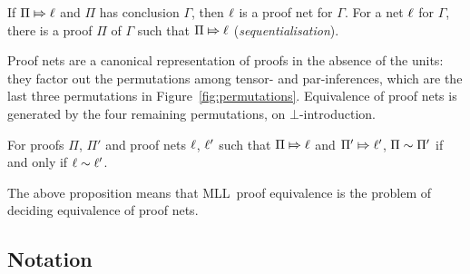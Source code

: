 \documentclass{sigplanconf}
\let\capsabbrev=\uppercase
\begin{document}
\begin{proposition}
\label{prop:correctness and sequentialisation}
%
%
If $\Pi\Mapsto\ell$ and $\Pi$ has conclusion $\Gamma$, then $\ell$ is a proof net for $\Gamma$.
%
For a net $\ell$ for $\Gamma$, there is a proof $\Pi$ of $\Gamma$ such that $\Pi\Mapsto\ell$ (\emph{sequentialisation}).
%
\end{proposition}


\noindent
Proof nets are a canonical representation of proofs in the absence of the units: they factor out the permutations among tensor- and par-inferences, which are the last three permutations in Figure~\ref{fig:permutations}.
%
Equivalence of proof nets is generated by the four remaining permutations, on $\bot$-introduction.



\begin{proposition}[\cite{HughesMLLProofNets}] %
\label{prop:proof nets work}
%
For proofs $\Pi$, $\Pi'$ and proof nets $\ell$, $\ell'$ such that $\Pi\Mapsto\ell$ and $\Pi'\Mapsto\ell'$, $\Pi\perm\Pi'$ if and only if $\links\perm\links'$.
%
\end{proposition}


\noindent
The above proposition means that \capsabbrev{mll}\ proof equivalence is the problem of deciding equivalence of proof nets.
%



\subsection*{Notation}
\end{document}
